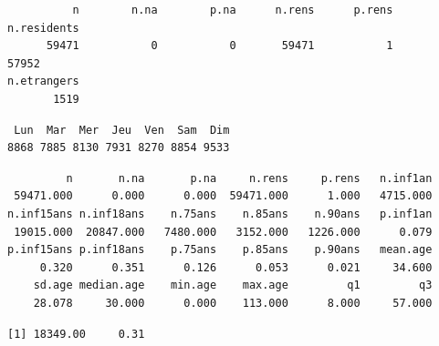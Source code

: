 \documentclass[]{article}
\newenvironment{Shaded}{\begin{snugshade}}{\end{snugshade}}
\newcommand{\KeywordTok}[1]{\textcolor[rgb]{0.13,0.29,0.53}{\textbf{{#1}}}}
\newcommand{\StringTok}[1]{\textcolor[rgb]{0.31,0.60,0.02}{{#1}}}
\newcommand{\CommentTok}[1]{\textcolor[rgb]{0.56,0.35,0.01}{\textit{{#1}}}}
\newcommand{\NormalTok}[1]{{#1}}
\begin{document}
\begin{verbatim}
          n        n.na        p.na      n.rens      p.rens n.residents 
      59471           0           0       59471           1       57952 
n.etrangers 
       1519 
\end{verbatim}

\begin{Shaded}
\end{Shaded}

\begin{verbatim}
 Lun  Mar  Mer  Jeu  Ven  Sam  Dim 
8868 7885 8130 7931 8270 8854 9533 
\end{verbatim}

\begin{Shaded}
\end{Shaded}

\begin{verbatim}
         n       n.na       p.na     n.rens     p.rens   n.inf1an 
 59471.000      0.000      0.000  59471.000      1.000   4715.000 
n.inf15ans n.inf18ans    n.75ans    n.85ans    n.90ans   p.inf1an 
 19015.000  20847.000   7480.000   3152.000   1226.000      0.079 
p.inf15ans p.inf18ans    p.75ans    p.85ans    p.90ans   mean.age 
     0.320      0.351      0.126      0.053      0.021     34.600 
    sd.age median.age    min.age    max.age         q1         q3 
    28.078     30.000      0.000    113.000      8.000     57.000 
\end{verbatim}

\begin{Shaded}
\end{Shaded}

\begin{verbatim}
[1] 18349.00     0.31
\end{verbatim}

\begin{Shaded}
\end{Shaded}
\end{document}
